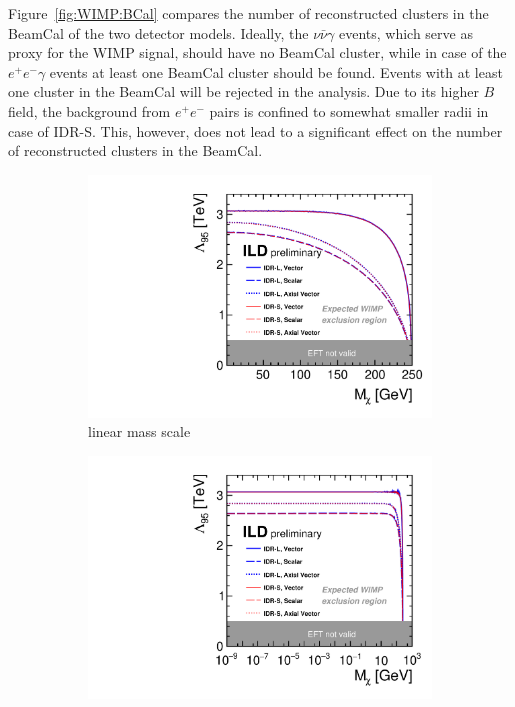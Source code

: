 Figure~\ref{fig:WIMP:BCal} compares the number of reconstructed clusters in the BeamCal of the two detector models. Ideally, the $\nu\bar{\nu}\gamma$ events, which serve as proxy for the WIMP signal, should have no BeamCal cluster, while in case of the $e^+e^-\gamma$ events at least one BeamCal cluster should be found. Events with at least one cluster in the BeamCal will be rejected in the analysis. Due to its higher $B$ field, the background from $e^+e^-$ pairs is confined to somewhat smaller radii in case of IDR-S. This, however, does not lead to a significant effect on the number of reconstructed clusters in the BeamCal.

\begin{figure}[htbp]
\begin{center}
\begin{subfigure}{0.49\hsize} 
 \includegraphics[width=\textwidth]{Performance/fig/sensitivity_H20_IDR.pdf}
 \caption{linear mass scale\label{fig:WIMP:limit:std}}
 \end{subfigure}
\begin{subfigure}{0.49\hsize} 
 \includegraphics[width=\textwidth]{Performance/fig/sensitivity_H20_IDR_logx.pdf}

\end{subfigure}
\end{center}
\end{figure}
